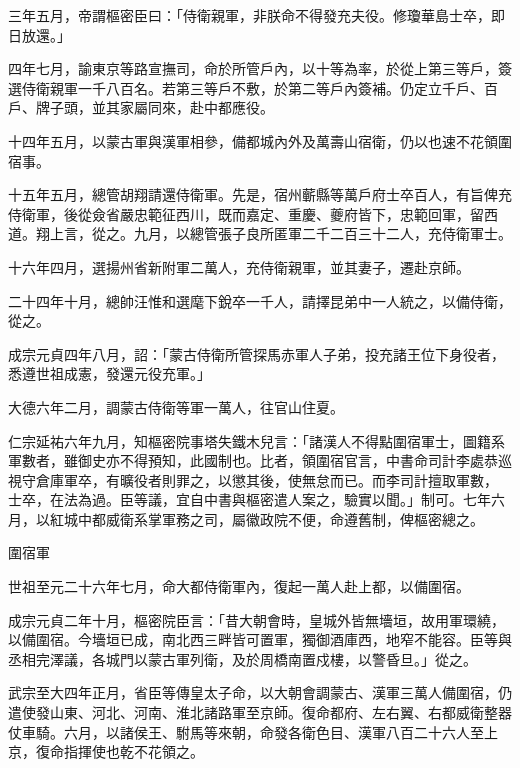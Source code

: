 \begin{pinyinscope}
 三年五月，帝謂樞密臣曰：「侍衛親軍，非朕命不得發充夫役。修瓊華島士卒，即日放還。」



 四年七月，諭東京等路宣撫司，命於所管戶內，以十等為率，於從上第三等戶，簽選侍衛親軍一千八百名。若第三等戶不敷，於第二等戶內簽補。仍定立千戶、百戶、牌子頭，並其家屬同來，赴中都應役。



 十四年五月，以蒙古軍與漢軍相參，備都城內外及萬壽山宿衛，仍以也速不花領圍宿事。



 十五年五月，總管胡翔請還侍衛軍。先是，宿州蘄縣等萬戶府士卒百人，有旨俾充侍衛軍，後從僉省嚴忠範征西川，既而嘉定、重慶、夔府皆下，忠範回軍，留西道。翔上言，從之。九月，以總管張子良所匿軍二千二百三十二人，充侍衛軍士。



 十六年四月，選揚州省新附軍二萬人，充侍衛親軍，並其妻子，遷赴京師。



 二十四年十月，總帥汪惟和選麾下銳卒一千人，請擇昆弟中一人統之，以備侍衛，從之。



 成宗元貞四年八月，詔：「蒙古侍衛所管探馬赤軍人子弟，投充諸王位下身役者，悉遵世祖成憲，發還元役充軍。」



 大德六年二月，調蒙古侍衛等軍一萬人，往官山住夏。



 仁宗延祐六年九月，知樞密院事塔失鐵木兒言：「諸漢人不得點圍宿軍士，圖籍系軍數者，雖御史亦不得預知，此國制也。比者，領圍宿官言，中書命司計李處恭巡視守倉庫軍卒，有曠役者則罪之，以懲其後，使無怠而已。而李司計擅取軍數，士卒，在法為過。臣等議，宜自中書與樞密遣人案之，驗實以聞。」制可。七年六月，以紅城中都威衛系掌軍務之司，屬徽政院不便，命遵舊制，俾樞密總之。



 圍宿軍



 世祖至元二十六年七月，命大都侍衛軍內，復起一萬人赴上都，以備圍宿。



 成宗元貞二年十月，樞密院臣言：「昔大朝會時，皇城外皆無墻垣，故用軍環繞，以備圍宿。今墻垣已成，南北西三畔皆可置軍，獨御酒庫西，地窄不能容。臣等與丞相完澤議，各城門以蒙古軍列衛，及於周橋南置戍樓，以警昏旦。」從之。



 武宗至大四年正月，省臣等傳皇太子命，以大朝會調蒙古、漢軍三萬人備圍宿，仍遣使發山東、河北、河南、淮北諸路軍至京師。復命都府、左右翼、右都威衛整器仗車騎。六月，以諸侯王、駙馬等來朝，命發各衛色目、漢軍八百二十六人至上京，復命指揮使也乾不花領之。




\end{pinyinscope}
